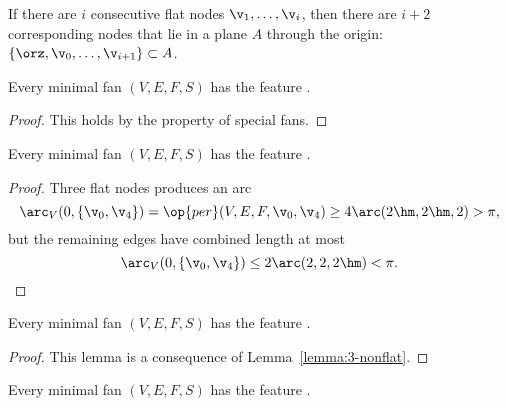 

If there are $i$ consecutive flat nodes $\v_1,\ldots,\v_i$, then there
are $i+2$ corresponding nodes that lie in a plane $A$ through the
origin: $\{\orz,\v_0,\ldots,\v_{i+1}\}\subset A$.

\begin{lemma}[]
Every minimal fan $(V,E,F,S)$ has the feature .
\end{lemma}

\begin{proof} This holds by the property  of special fans.
\end{proof}


\begin{lemma}[]
Every minimal fan $(V,E,F,S)$ has the feature .
\end{lemma}

\begin{proof}  Three flat nodes produces an arc
\begin{displaymath}
  \arc_V(0,\{\v_0,\v_4\}) 
= \op{per}(V,E,F,\v_0,\v_4) \ge4\arc(2\hm,2\hm,2) > \pi,
\end{displaymath}
but the remaining edges  have combined length at most
\begin{displaymath}
\arc_V(0,\{\v_0,\v_4\})\le 2\arc(2,2,2\hm) < \pi.
\end{displaymath}
\end{proof}

\begin{lemma}[]
Every minimal fan $(V,E,F,S)$ has the feature .
\end{lemma}

\begin{proof}  
This lemma is a consequence of Lemma~\ref{lemma:3-nonflat}.
\end{proof}



\begin{lemma}[]
Every minimal fan $(V,E,F,S)$ has the feature .
\end{lemma}

